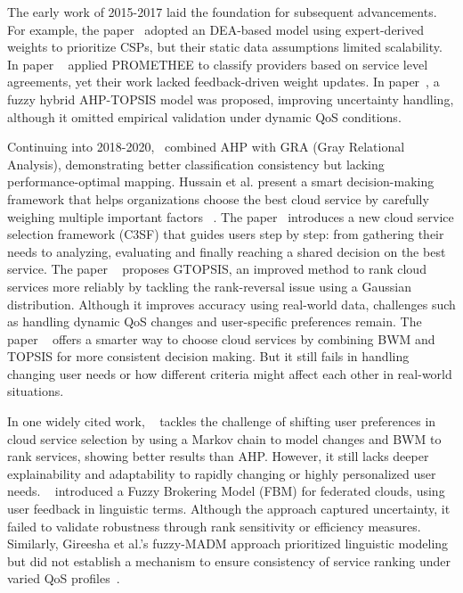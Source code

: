 \documentclass[twocolumn]{svjour3}
\begin{document}
The early work of 2015-2017 laid the foundation for subsequent advancements. For example, the paper~\cite{jatoth2017evaluating} adopted an DEA-based model using expert-derived weights to prioritize CSPs, but their static data assumptions limited scalability. In paper ~\cite{boutkhoum2016selection} applied PROMETHEE to classify providers based on service level agreements, yet their work lacked feedback-driven weight updates. In paper~\cite{kumar2016evaluation}, a fuzzy hybrid AHP-TOPSIS model was proposed, improving uncertainty handling, although it omitted empirical validation under dynamic QoS conditions.

Continuing into 2018-2020,~\cite{wang2019cloud} combined AHP with GRA (Gray Relational Analysis), demonstrating better classification consistency but lacking performance-optimal mapping. Hussain et al. present a smart decision-making framework that helps organizations choose the best cloud service by carefully weighing multiple important factors~\cite{hussain2020novel} . The paper~\cite{hussain2022cloud} introduces a new cloud service selection framework (C3SF) that guides users step by step: from gathering their needs to analyzing, evaluating and finally reaching a shared decision on the best service. The paper ~\cite{tiwari2021g} proposes GTOPSIS, an improved method to rank cloud services more reliably by tackling the rank-reversal issue using a Gaussian distribution. Although it improves accuracy using real-world data, challenges such as handling dynamic QoS changes and user-specific preferences remain. The paper ~\cite{youssef2020integrated} offers a smarter way to choose cloud services by combining BWM and TOPSIS for more consistent decision making. But it still fails in handling changing user needs or how different criteria might affect each other in real-world situations.

In one widely cited work, ~\cite{nawaz2018mcdm} tackles the challenge of shifting user preferences in cloud service selection by using a Markov chain to model changes and BWM to rank services, showing better results than AHP. However, it still lacks deeper explainability and adaptability to rapidly changing or highly personalized user needs. ~\cite{chauhan2025fbm} introduced a Fuzzy Brokering Model (FBM) for federated clouds, using user feedback in linguistic terms. Although the approach captured uncertainty, it failed to validate robustness through rank sensitivity or efficiency measures. Similarly, Gireesha et al.'s fuzzy-MADM approach prioritized linguistic modeling but did not establish a mechanism to ensure consistency of service ranking under varied QoS profiles~\cite{gireesha2022fuzzy}.
\end{document}
